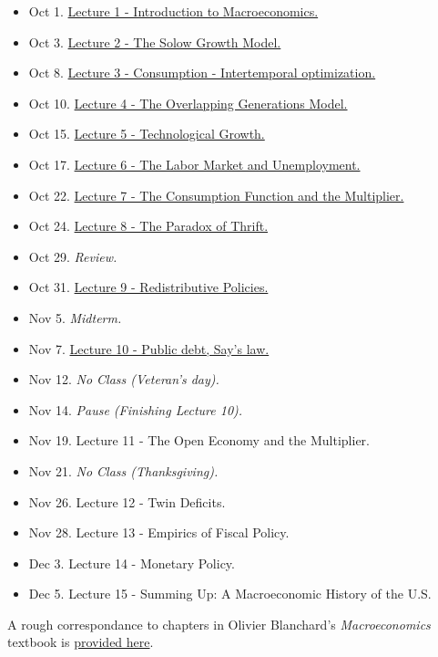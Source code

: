 \documentclass[]{book}
\providecommand{\tightlist}{%
  \setlength{\itemsep}{0pt}\setlength{\parskip}{0pt}}
\theoremstyle{definition}
\theoremstyle{definition}
\theoremstyle{definition}
\theoremstyle{remark}
\begin{document}
\begin{itemize}
\tightlist
\item
  Oct 1. \protect\hyperlink{intro-cobb}{Lecture 1 - Introduction to
  Macroeconomics.}
\item
  Oct 3. \protect\hyperlink{solow}{Lecture 2 - The Solow Growth Model.}
\item
  Oct 8. \protect\hyperlink{two-period}{Lecture 3 - Consumption -
  Intertemporal optimization.}
\item
  Oct 10. \protect\hyperlink{olg}{Lecture 4 - The Overlapping
  Generations Model.}
\item
  Oct 15. \protect\hyperlink{technology}{Lecture 5 - Technological
  Growth.}
\item
  Oct 17. \protect\hyperlink{labor-market}{Lecture 6 - The Labor Market
  and Unemployment.}
\item
  Oct 22. \protect\hyperlink{cons-function}{Lecture 7 - The Consumption
  Function and the Multiplier.}
\item
  Oct 24. \protect\hyperlink{paradox-thrift}{Lecture 8 - The Paradox of
  Thrift.}
\item
  Oct 29. \emph{Review.}
\item
  Oct 31. \protect\hyperlink{redistributive}{Lecture 9 - Redistributive
  Policies.}
\item
  Nov 5. \emph{Midterm.}
\item
  Nov 7. \protect\hyperlink{public-debt}{Lecture 10 - Public debt, Say's
  law.}
\item
  Nov 12. \emph{No Class (Veteran's day).}
\item
  Nov 14. \emph{Pause (Finishing Lecture 10).}
\item
  Nov 19. Lecture 11 - The Open Economy and the Multiplier.
\item
  Nov 21. \emph{No Class (Thanksgiving).}
\item
  Nov 26. Lecture 12 - Twin Deficits.
\item
  Nov 28. Lecture 13 - Empirics of Fiscal Policy.
\item
  Dec 3. Lecture 14 - Monetary Policy.
\item
  Dec 5. Lecture 15 - Summing Up: A Macroeconomic History of the U.S.
\end{itemize}

A rough correspondance to chapters in Olivier Blanchard's
\emph{Macroeconomics} textbook is
\href{https://docs.google.com/spreadsheets/d/1OQzilQvOLusOsv16pJ3FgFN1YAadELe64jJAV2PEsF0/edit?usp=sharing}{provided
here}.
\end{document}
